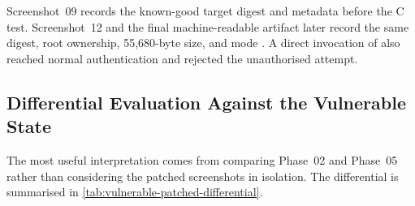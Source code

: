 Screenshot~09 records the known-good target digest and metadata before the C
test. Screenshot~12 and the final machine-readable artifact later record the
same digest, root ownership, 55,680-byte size, and mode . A direct
invocation of  also reached normal authentication and rejected
the unauthorised attempt.

\subsection{Differential Evaluation Against the Vulnerable State}

The most useful interpretation comes from comparing Phase~02 and Phase~05
rather than considering the patched screenshots in isolation. The differential
is summarised in \cref{tab:vulnerable-patched-differential}.

